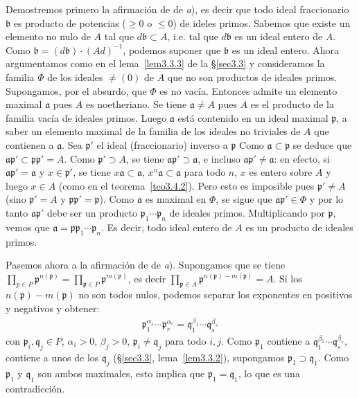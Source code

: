 \documentclass[bibtotoc,leqno,spanish]{amsbook}
\let\emph\relax %
\newcommand{\idl}[1]{\mathfrak{#1}}
\numberwithin{equation}{section}
\theoremstyle{note}
\theoremstyle{note}
\theoremstyle{rem}
\numberwithin{theorem}{section}
\numberwithin{proposition}{section}
\numberwithin{definition}{section}
\numberwithin{lemma}{section}
\numberwithin{corollary}{section}
\numberwithin{example}{section}
\numberwithin{footnote}{section}%
\begin{document}
Demostremos primero la afirmaci\'on de \emph{existencia} de {\itshape a}), es decir que todo ideal fraccionario
$\idl{b}$ es producto de potencias ($\geq 0$ o $\leq 0$) de ideles primos. Sabemos que existe un
elemento no nulo de $A$ tal que $d\idl{b}\subset A$, i.e. tal que $d\idl{b}$ es un ideal entero de $A$.
Como $\idl{b} = (d\idl{b})\cdot(Ad)^{-1}$, podemos suponer que $\idl{b}$ es un ideal entero. Ahora
argumentamos como en el lema~\ref{lem3.3.3} de la \S\ref{sec3.3} y consideramos la familia $\Phi$ de los ideales $\neq(0)$ de
$A$ que no son productos de ideales primos. Supongamos, por el absurdo, que $\Phi$ es no vac\'ia. Entonces
admite un elemento maximal $\idl{a}$ pues $A$ es noetheriano. Se tiene $\idl{a}\neq A$ pues $A$ es el
producto de la familia vac\'ia de ideales primos. Luego $\idl{a}$ est\'a contenido en un ideal maximal
$\idl{p}$, a saber un elemento maximal de la familia de los ideales no triviales de $A$ que contienen
a $\idl{a}$. Sea $\idl{p}'$ el ideal (fraccionario) inverso a $\idl{p}$ Como $\idl{a}\subset\idl{p}$ se deduce que
$\idl{a}\idl{p}'\subset\idl{p}\idl{p}' = A$. Como $\idl{p}'\supset A$, se tiene $\idl{a}\idl{p}'\supset\idl{a}$,
e incluso $\idl{a}\idl{p}'\neq\idl{a}$: en efecto, si $\idl{a}\idl{p}' = \idl{a}$ y $x\in\idl{p}'$, se tiene
$x\idl{a}\subset\idl{a}$, $x^{n}\idl{a}\subset\idl{a}$ para todo $n$, $x$ es entero sobre $A$ y luego $x\in A$
(como en el teorema~\ref{teo3.4.2}). Pero esto es imposible pues $\idl{p}'\neq A$ (sino $\idl{p}' = A$ y $\idl{p}\idl{p}'=\idl{p}$).
Como $\idl{a}$ es maximal en $\Phi$, se sigue que $\idl{a}\idl{p}'\in\Phi$ y por lo tanto $\idl{a}\idl{p}'$ debe
ser un producto $\idl{p}_{1}\cdots\idl{p}_{n}$ de ideales primos. Multiplicando por $\idl{p}$, vemos que
$\idl{a} = \idl{p}\idl{p}_{1}\cdots\idl{p}_{n}$. Es decir, todo ideal entero de $A$ es un producto de ideales primos.

Pasemos ahora a la afirmaci\'on de \emph{unicidad} de {\itshape a}). Supongamos que se tiene $\prod_{p\in P}\idl{p}^{n(\idl{p})}
=\prod_{\idl{p}\in P}\idl{p}^{m(\idl{p})}$, es decir $\prod_{\idl{p}\in A}\idl{p}^{n(\idl{p})-m(\idl{p})}=A$.
Si los $n(\idl{p})-m(\idl{p})$ no son todos nulos, podemos separar los exponentes en positivos y negativos y
obtener:
\begin{gather}
\idl{p}_{1}^{\alpha_{1}}\cdots\idl{p}_{r}^{\alpha_{r}} = \idl{q}_{1}^{\beta_{1}}\cdots\idl{q}_{s}^{\beta_{s}}
\end{gather}
con $\idl{p}_{i},\idl{q}_{j}\in P$, $\alpha_{i} > 0$, $\beta_{j} > 0$, $\idl{p}_{i}\neq\idl{q}_{j}$ para todo
$i, j$. Como $\idl{p}_{1}$ contiene a $\idl{q}_{1}^{\beta_{1}}\cdots\idl{q}_{s}^{\beta_{s}}$, contiene
a unos de los $\idl{q}_{j}$ (\S\ref{sec3.3}, lema~\ref{lem3.3.2}), supongamos $\idl{p}_{1}\supset\idl{q}_{1}$. Como
$\idl{p}_{1}$ y $\idl{q}_{1}$ son ambos maximales, esto implica que $\idl{p}_{1}=\idl{q}_{1}$, lo que
es una contradicci\'on.
\end{document}

